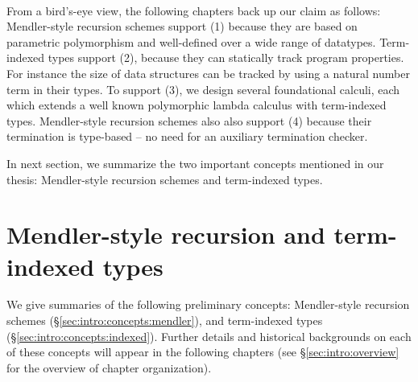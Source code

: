 \paragraph{}
From a bird's-eye view, the following chapters back up our claim as follows:
Mendler-style recursion schemes support (1) because they are based on
parametric polymorphism and well-defined over a wide range of datatypes.
Term-indexed types support (2), because they can statically track
program properties. For instance the size of data structures can be tracked
by using a natural number term in their types.
To support (3), we design several foundational calculi, each which extends
a well known polymorphic lambda calculus with term-indexed types.
Mendler-style recursion schemes also also support (4) because their
termination is type-based -- no need for an auxiliary termination checker.

In next section, we summarize the two important concepts mentioned
in our thesis: Mendler-style recursion schemes and term-indexed types.

\section{Mendler-style recursion and term-indexed types}
\label{sec:intro:concepts}
We give summaries of the following preliminary concepts:
Mendler-style recursion schemes (\S\ref{sec:intro:concepts:mendler}),
and term-indexed types (\S\ref{sec:intro:concepts:indexed}).
Further details and historical backgrounds on each of these concepts
will appear in the following chapters (see \S\ref{sec:intro:overview}
for the overview of chapter organization).

